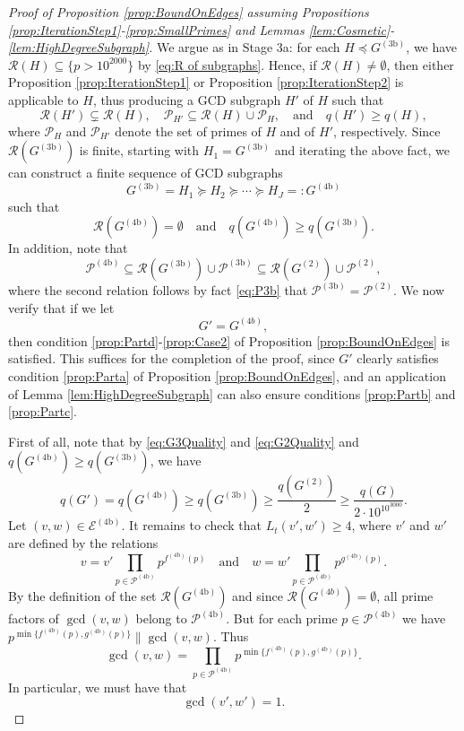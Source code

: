 \documentclass[12pt]{amsart}
\numberwithin{equation}{section}
\theoremstyle{definition}
\theoremstyle{remark}
\newcommand{\CE}{\mathcal{E}}
\newcommand{\CP}{\mathcal{P}}
\newcommand{\CR}{\mathcal{R}}
\renewcommand{\ge}{\geqslant}
\begin{document}
\begin{proof}[Proof of Proposition \ref{prop:BoundOnEdges} assuming Propositions \ref{prop:IterationStep1}-\ref{prop:SmallPrimes} and Lemmas \ref{lem:Cosmetic}-\ref{lem:HighDegreeSubgraph}]
We argue as in Stage 3a: for each $H\preceq G^{(3\text{b})}$, we have  $\CR(H)\subseteq\{p>10^{2000}\}$ by \eqref{eq:R of subgraphs}. Hence, if $\CR(H)\neq\emptyset$, then either Proposition \ref{prop:IterationStep1} or Proposition \ref{prop:IterationStep2} is applicable to $H$, thus producing a GCD subgraph $H'$ of $H$ such that
\begin{equation}\label{eq:Prop11}
\CR(H')\subsetneq \CR(H),\quad
\CP_{H'}\subseteq \CR(H)\cup \CP_H ,
\quad\text{and}\quad
q(H')\ge q(H),
\end{equation}
where $\CP_H$ and $\CP_{H'}$ denote the set of primes of $H$ and of $H'$, respectively. 
Since $\CR(G^{(3\text{b})})$ is finite, starting with $H_1=G^{(3\text{b})}$ and iterating the above fact, we can construct a finite sequence of GCD subgraphs 
\[
G^{(3\text{b})}=H_1\succeq H_2\succeq\cdots\succeq H_J=:G^{(4\text{b})}
\] 
such that
\[
\CR(G^{(4\text{b})})=\emptyset\quad\text{and}\quad 
q(G^{(4\text{b})})\ge q(G^{(3\text{b})}).
\]
In addition, note that 
\[
\CP^{(4\text{b})}
	\subseteq \CR(G^{(3\text{b})})\cup\CP^{(3\text{b})}
	\subseteq \CR(G^{(2)})\cup\CP^{(2)},
\]
where the second relation follows by fact \eqref{eq:P3b} that $\CP^{(3\text{b})}=\CP^{(2)}$. 
We now verify that if we let 
\[
G'=G^{(4b)},
\]
then condition \ref{prop:Partd}-\ref{prop:Case2} of Proposition \ref{prop:BoundOnEdges} is satisfied. This suffices for the completion of the proof, since $G'$ clearly satisfies condition \ref{prop:Parta} of Proposition \ref{prop:BoundOnEdges}, and an application of Lemma \ref{lem:HighDegreeSubgraph} can also ensure conditions \ref{prop:Partb} and \ref{prop:Partc}.


First of all, note that by \eqref{eq:G3Quality} and \eqref{eq:G2Quality} and $q(G^{(4\text{b})})\ge q(G^{(3\text{b})})$, we have
\[
q(G') = q(G^{(4\text{b})})\ge q(G^{(3\text{b})})\ge \frac{q(G^{(2)})}{2} \ge \frac{q(G)}{2\cdot 10^{10^{3000}}}.
\]
Let $(v,w)\in\CE^{(4\text{b})}$. It remains to check that $L_t(v',w')\ge4$, where $v'$ and $w'$ are defined by the relations
\[
v=v'\prod_{p\in\CP^{(4\text{b})}}p^{f^{(4\text{b})}(p)}
\quad\text{and}\quad 
w=w'\prod_{p\in\CP^{(4\text{b})}}p^{g^{(4\text{b})}(p)}.
\]
By the definition of the set $\CR(G^{(4\text{b})})$ and since $\CR(G^{(4b)})=\emptyset$, all prime factors of $\gcd(v,w)$ belong to $\CP^{(4\text{b})}$. But for each prime $p\in\CP^{(4\text{b})}$ we have $p^{\min\{f^{(4\text{b})}(p),g^{(4\text{b})}(p)\}}\|\gcd(v,w)$. Thus
\[
\gcd(v,w) = \prod_{p\in\CP^{(4\text{b})}}p^{\min\{f^{(4\text{b})}(p),g^{(4\text{b})}(p)\}}.
\]
In particular, we must have that 
\[
\gcd(v',w')=1.
\]


\end{proof}
\end{document}
